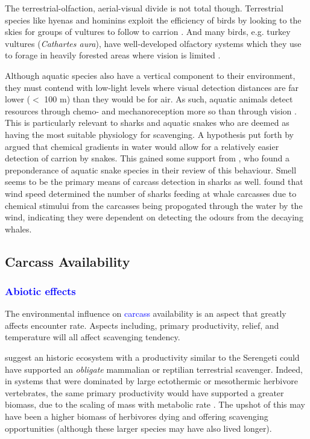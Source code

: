 \documentclass[a4paper,12pt]{article}
\begin{document}
The terrestrial-olfaction, aerial-visual divide is not total though.
Terrestrial species like hyenas and hominins exploit the efficiency of birds by looking to the skies for groups of vultures to follow to carrion \citep{jones2015african,ruxton2013endurance}. 
And many birds, e.g. turkey vultures (\textit{Cathartes aura}), have well-developed olfactory systems \citep{AR:AR22815} which they use to forage in heavily forested areas where vision is limited \citep{houston1986olfaction}. 

Although aquatic species also have a vertical component to their environment, they must contend with low-light levels where visual detection distances are far lower ($<$ 100 m) than they would be for air.
As such, aquatic animals detect resources through chemo- and mechanoreception more so than through vision \citep{ruxton2004energetic}.
This is particularly relevant to sharks and aquatic snakes who are deemed as having the most suitable physiology for scavenging.
A hypothesis put forth by \cite{sazima1990necrofagia} argued that chemical gradients in water would allow for a relatively easier detection of carrion by snakes.
This gained some support from \cite{devault2002scavenging}, who found a preponderance of aquatic snake species in their review of this behaviour.
Smell seems to be the primary means of carcass detection in sharks as well. 
\cite{fallows2013white} found that wind speed determined the number of sharks feeding at whale carcasses due to chemical stimului from the carcasses being propogated through the water by the wind, indicating they were dependent on detecting the odours from the decaying whales.

\subsection{Carcass Availability}
\subsubsection{\textcolor{blue}{Abiotic effects}}
The environmental influence on \textcolor{blue}{carcass} availability is an aspect that greatly affects encounter rate. %
Aspects including, primary productivity, relief, and temperature will all affect scavenging tendency. 

\cite{ruxton2004obligate} suggest an historic ecosystem with a productivity similar to the Serengeti could have supported an \textit{obligate} mammalian or reptilian terrestrial scavenger.
Indeed, in systems that were dominated by large ectothermic or mesothermic herbivore vertebrates, the same primary productivity would have supported a greater biomass, due to the scaling of mass with metabolic rate \citep{mcnab2009resources}.
The upshot of this may have been a higher biomass of herbivores dying and offering scavenging opportunities (although these larger species may have also lived longer).
\end{document}
